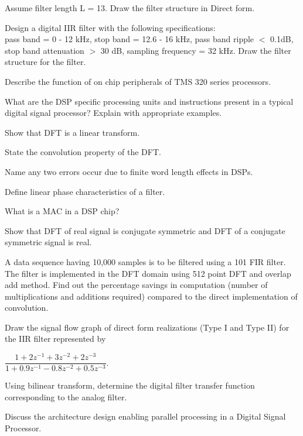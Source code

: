 Assume filter length L = 13. Draw the filter structure in Direct form.
\Or
\item Design a digital IIR filter with the following specifications:\\
  pass band = 0 - 12 kHz, stop band = 12.6 - 16 kHz, pass band ripple $<$ 0.1dB,
  stop band attenuation $>$ 30 dB, sampling frequency = 32 kHz. Draw the filter structure
  for the filter.
\ene

\item \iitem Describe the function of on chip peripherals of TMS 320 series processors.
\Or
\item What are the DSP specific processing units and instructions present in a typical digital
  signal processor? Explain with appropriate examples.
\ene

\markC
\ene

\newpage

\sub{\subj}
\maxtime

\partA

\iitem Show that DFT is a linear transform.
\item State the convolution property of the DFT.
\item Name any two errors occur due to finite word length effects in DSPs.
\item Define linear phase characteristics of a filter.
\item What is a MAC in a DSP chip?

\markA
\partB

\item Show that DFT of real signal is conjugate symmetric and DFT of a conjugate symmetric
  signal is real.
\item A data sequence having 10,000 samples is to be filtered using a 101 FIR filter. The filter
  is implemented in the DFT domain using 512 point DFT and overlap add method. Find out the percentage savings
  in computation (number of multiplications and additions required) compared to the direct implementation of
  convolution.
\item Draw the signal flow graph of direct form realizations (Type I and Type II) for the IIR filter
  represented by

\hspace{1cm}  $\dfrac{ 1 + 2 z^{-1} + 3 z^{-2} + 2z^{-3}}{
    1 + 0.9z^{-1} - 0.8z^{-2} + 0.5z^{-3}}$.
\item Using bilinear transform, determine the digital filter transfer function corresponding to the analog
  filter.
\item Discuss the architecture design enabling parallel processing in a Digital Signal Processor.

